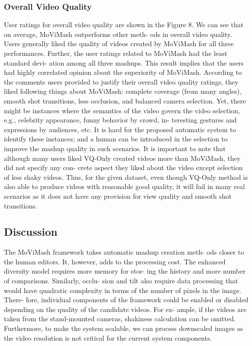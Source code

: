 \documentclass{sig-alternate}
\begin{document}
\subsubsection{ Overall Video Quality}
User ratings for overall video quality are shown in the Figure 8.
We can see that on average, MoViMash outperforms other meth-
ods in overall video quality. Users generally liked the quality of
videos created by MoViMash for all three performances. Further,
the user ratings related to MoViMash had the least standard devi-
ation among all three mashups. This result implies that the users
had highly correlated opinion about the superiority of MoViMash.
According to the comments users provided to justify their overall
video quality ratings, they liked following things about MoViMash:
complete coverage (from many angles), smooth shot transitions,
less occlusion, and balanced camera selection. Yet, there might
be instances where the semantics of the video govern the video
selection, e.g., celebrity appearance, funny behavior by crowd, in-
teresting gestures and expressions by audiences, etc. It is hard for
the proposed automatic system to identify these instances; and a
human can be introduced in the selection to improve the mashup
quality in such scenarios.
It is important to note that although many users liked VQ-Only
created videos more than MoViMash, they did not specify any con-
crete aspect they liked about the video except selection of less
shaky videos. Thus, for the given dataset, even though VQ-Only
method is also able to produce videos with reasonable good quality,
it will fail in many real scenarios as it does not have any provision
for view quality and smooth shot transitions.


\subsection{Discussion}
The MoViMash framework takes automatic mashup creation meth-
ods closer to the human editors. It, however, adds to the processing
cost. The enhanced diversity model requires more memory for stor-
ing the history and more number of comparisons. Similarly, occlu-
sion and tilt also require data processing that would have quadratic
complexity in terms of the number of pixels in the image. There-
fore, individual components of the framework could be enabled or
disabled depending on the quality of the candidate videos. For ex-
ample, if the videos are taken from the stand-mounted cameras,
shakiness calculation can be omitted. Furthermore, to make the
system scalable, we can process downscaled images as the video
resolution is not critical for the current system components.
\end{document}
